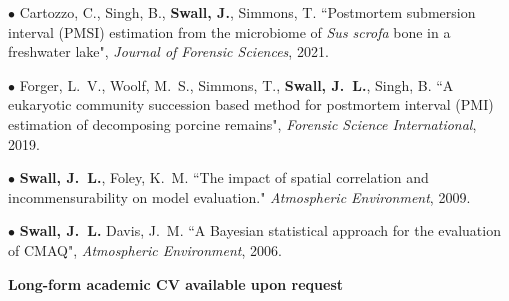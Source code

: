 \documentclass[11pt]{article}
\begin{document}
$\bullet$ Cartozzo, C., Singh, B., \textbf{Swall, J.},  Simmons, T.
``Postmortem submersion interval (PMSI) estimation from the microbiome of
\textit{Sus scrofa} bone in a freshwater lake", \textit{Journal of
Forensic Sciences}, 2021.

$\bullet$ Forger, L.~V., Woolf, M.~S., Simmons, T., \textbf{Swall, J.~L.},
Singh, B.  ``A eukaryotic community succession based method for
postmortem interval (PMI) estimation of decomposing porcine
remains", \textit{Forensic Science International}, 2019.


$\bullet$ \textbf{Swall, J.~L.}, Foley, K.~M.  ``The impact of spatial
correlation and incommensurability on model evaluation."
\textit{Atmospheric Environment}, 2009.

$\bullet$ \textbf{Swall, J.~L.} Davis, J.~M. ``A Bayesian
statistical approach for the evaluation of CMAQ", \textit{Atmospheric
Environment}, 2006.




\vspace*{0.3in}
\textbf{Long-form academic CV available upon request}
\end{document}
